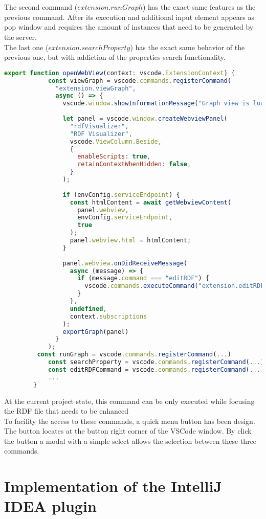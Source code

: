 	\\
	\\
	The second command ($extension.runGraph$) has the exact same features as the previous command.
	After its execution and additional input element appears as pop window and requires the amount of instances that need to be generated by the server.
	\\
	The last one ($extension.searchProperty$) has the exact same behavior of the previous one, but with addiction of the properties search functionality.
	\\
	\begin{lstlisting}[caption={openWebView}, label={lst:open-web-view}, language=JavaScript]
		export function openWebView(context: vscode.ExtensionContext) {
			const viewGraph = vscode.commands.registerCommand(
			  "extension.viewGraph",
			  async () => {
				vscode.window.showInformationMessage("Graph view is loaded");
		  
				let panel = vscode.window.createWebviewPanel(
				  "rdfVisualizer",
				  "RDF Visualizer",
				  vscode.ViewColumn.Beside,
				  {
					enableScripts: true,
					retainContextWhenHidden: false,
				  }
				);
		  
				if (envConfig.serviceEndpoint) {
				  const htmlContent = await getWebviewContent(
					panel.webview,
					envConfig.serviceEndpoint,
					true
				  );
				  panel.webview.html = htmlContent;
				}
		  
				panel.webview.onDidReceiveMessage(
				  async (message) => {
					if (message.command === "editRDF") {
					  vscode.commands.executeCommand("extension.editRDF");
					}
				  },
				  undefined,
				  context.subscriptions
				);
				exportGraph(panel)
			  }
			);
		 const runGraph = vscode.commands.registerCommand(...)
			const searchProperty = vscode.commands.registerCommand(...)
			const editRDFCommand = vscode.commands.registerCommand(...)
			...
		}
		\end{lstlisting}
	At the current project state, this command can be only executed while focusing the RDF file that needs to be enhanced
	\\
	To facility the access to these commands, a quick menu button has been design. The button locates at the button right corner of the VSCode window. By click the button a modal with a simple select allows the selection between these three commands. 

\section{Implementation of the IntelliJ IDEA plugin}	

